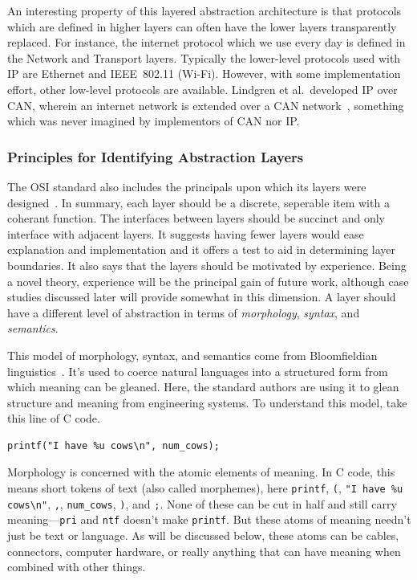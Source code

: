 \documentclass[english,12pt,a4paper,pdftex,eng,utf8]{aaltothesis}
\begin{document}
An interesting property of this layered abstraction architecture is that protocols which are defined in higher layers can often have the lower layers transparently replaced.  For instance, the internet protocol which we use every day is defined in the Network and Transport layers.  Typically the lower-level protocols used with IP are Ethernet and IEEE~802.11 (Wi-Fi).  However, with some implementation effort, other low-level protocols are available.  Lindgren et al.\ developed IP over CAN, wherein an internet network is extended over a CAN network~\cite{Lindgren2008}, something which was never imagined by implementors of CAN nor IP.\

\subsubsection{Principles for Identifying Abstraction Layers}

The OSI standard also includes the principals upon which its layers were designed~\cite[§6.2.1]{ISO7498-1}.  In summary, each layer should be a discrete, seperable item with a coherant function.  The interfaces between layers should be succinct and only interface with adjacent layers.  It suggests having fewer layers would ease explanation and implementation and it offers a test to aid in determining layer boundaries.  It also says that the layers should be motivated by experience.  Being a novel theory, experience will be the principal gain of future work, although case studies discussed later will provide somewhat in this dimension.  A layer should have a different level of abstraction in terms of {\it morphology}, {\it syntax}, and {\it semantics}.

This model of morphology, syntax, and semantics come from Bloomfieldian linguistics~\cite{Bloomfield1923}.  It's used to coerce natural languages into a structured form from which meaning can be gleaned.  Here, the standard authors are using it to glean structure and meaning from engineering systems.  To understand this model, take this line of C code.

\begin{verbatim}
printf("I have %u cows\n", num_cows);
\end{verbatim}

Morphology is concerned with the atomic elements of meaning.  In C code, this means short tokens of text (also called morphemes), here \verb|printf|, \verb|(|, \verb|"I have %u cows\n"|, \verb|,|, \verb|num_cows|, \verb|)|, and \verb|;|.  None of these can be cut in half and still carry meaning---\verb|pri| and \verb|ntf| doesn't make \verb|printf|.  But these atoms of meaning needn't just be text or language.  As will be discussed below, these atoms can be cables, connectors, computer hardware, or really anything that can have meaning when combined with other things.
\end{document}

